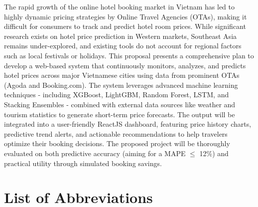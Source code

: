 \documentclass[12pt,a4paper]{report}
\begin{document}
The rapid growth of the online hotel booking market in Vietnam has led to highly dynamic pricing strategies by Online Travel Agencies (OTAs), making it difficult for consumers to track and predict hotel room prices. While significant research exists on hotel price prediction in Western markets, Southeast Asia remains under-explored, and existing tools do not account for regional factors such as local festivals or holidays. This proposal presents a comprehensive plan to develop a web-based system that continuously monitors, analyzes, and predicts hotel prices across major Vietnamese cities using data from prominent OTAs (Agoda and Booking.com). The system leverages advanced machine learning techniques - including XGBoost, LightGBM, Random Forest, LSTM, and Stacking Ensembles - combined with external data sources like weather and tourism statistics to generate short-term price forecasts. The output will be integrated into a user-friendly ReactJS dashboard, featuring price history charts, predictive trend alerts, and actionable recommendations to help travelers optimize their booking decisions. The proposed project will be thoroughly evaluated on both predictive accuracy (aiming for a MAPE $\leq$ 12\%) and practical utility through simulated booking savings.
\newpage

\tableofcontents
\newpage

\listoffigures
{}
\newpage

\listoftables
{}
\newpage

\chapter*{List of Abbreviations}
\end{document}
